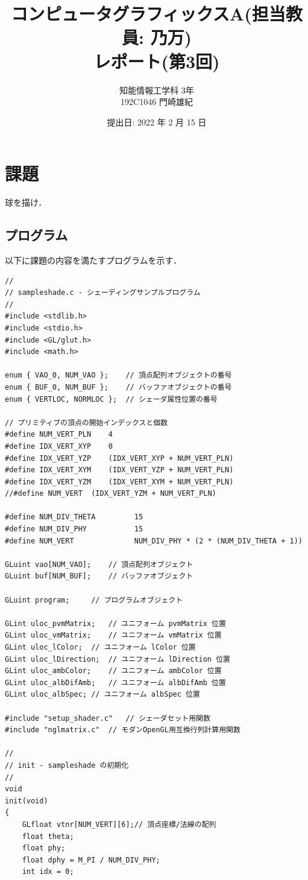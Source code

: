 \documentclass[12pt]{jreport}
\title{コンピュータグラフィックスA(担当教員: 乃万) \\ レポート(第3回)}
\author{知能情報工学科 3年	\\ 192C1046 門崎雄紀}
\date{提出日: 2022 年 2 月 15 日}
\begin{document}
\maketitle

\chapter{課題}
球を描け．

\section{プログラム}

以下に課題の内容を満たすプログラムを示す．
\begin{verbatim}
//
// sampleshade.c - シェーディングサンプルプログラム
//
#include <stdlib.h>
#include <stdio.h>
#include <GL/glut.h>
#include <math.h>

enum { VAO_0, NUM_VAO };	// 頂点配列オブジェクトの番号
enum { BUF_0, NUM_BUF };	// バッファオブジェクトの番号
enum { VERTLOC, NORMLOC };	// シェーダ属性位置の番号

// プリミティブの頂点の開始インデックスと個数
#define NUM_VERT_PLN	4
#define IDX_VERT_XYP	0
#define IDX_VERT_YZP	(IDX_VERT_XYP + NUM_VERT_PLN)
#define IDX_VERT_XYM	(IDX_VERT_YZP + NUM_VERT_PLN)
#define IDX_VERT_YZM	(IDX_VERT_XYM + NUM_VERT_PLN)
//#define NUM_VERT	(IDX_VERT_YZM + NUM_VERT_PLN)

#define NUM_DIV_THETA         15
#define NUM_DIV_PHY           15
#define NUM_VERT              NUM_DIV_PHY * (2 * (NUM_DIV_THETA + 1))

GLuint vao[NUM_VAO];	// 頂点配列オブジェクト
GLuint buf[NUM_BUF];	// バッファオブジェクト

GLuint program;		// プログラムオブジェクト

GLint uloc_pvmMatrix;	// ユニフォーム pvmMatrix 位置
GLint uloc_vmMatrix;	// ユニフォーム vmMatrix 位置
GLint uloc_lColor;	// ユニフォーム lColor 位置
GLint uloc_lDirection;	// ユニフォーム lDirection 位置
GLint uloc_ambColor;	// ユニフォーム ambColor 位置
GLint uloc_albDifAmb;	// ユニフォーム albDifAmb 位置
GLint uloc_albSpec;	// ユニフォーム albSpec 位置

#include "setup_shader.c"	// シェーダセット用関数
#include "nglmatrix.c"	// モダンOpenGL用互換行列計算用関数

//
// init - sampleshade の初期化
//
void
init(void)
{
    GLfloat vtnr[NUM_VERT][6];// 頂点座標/法線の配列
    float theta;
    float phy;
    float dphy = M_PI / NUM_DIV_PHY;
    int idx = 0;
    

\end{verbatim}
\end{document}
